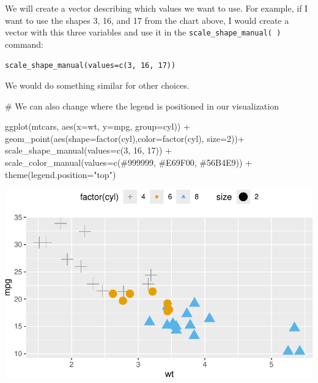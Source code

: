 \documentclass[
  letterpaper,
  DIV=11,
  numbers=noendperiod]{scrreprt}
\newenvironment{Shaded}{\begin{snugshade}}{\end{snugshade}}
\newcommand{\AttributeTok}[1]{\textcolor[rgb]{0.40,0.45,0.13}{#1}}
\newcommand{\CommentTok}[1]{\textcolor[rgb]{0.37,0.37,0.37}{#1}}
\newcommand{\DecValTok}[1]{\textcolor[rgb]{0.68,0.00,0.00}{#1}}
\newcommand{\FunctionTok}[1]{\textcolor[rgb]{0.28,0.35,0.67}{#1}}
\newcommand{\NormalTok}[1]{\textcolor[rgb]{0.00,0.23,0.31}{#1}}
\newcommand{\SpecialCharTok}[1]{\textcolor[rgb]{0.37,0.37,0.37}{#1}}
\newcommand{\StringTok}[1]{\textcolor[rgb]{0.13,0.47,0.30}{#1}}
\begin{document}
We will create a vector describing which values we want to use. For
example, if I want to use the shapes 3, 16, and 17 from the chart above,
I would create a vector with this three variables and use it in the
\texttt{scale\_shape\_manual(\ )} command:

\texttt{scale\_shape\_manual(values=c(3,\ 16,\ 17))}

We would do something similar for other choices.

\begin{Shaded}
\begin{Highlighting}[]
\CommentTok{\# We can also change where the legend is positioned in our visualization}

\FunctionTok{ggplot}\NormalTok{(mtcars, }\FunctionTok{aes}\NormalTok{(}\AttributeTok{x=}\NormalTok{wt, }\AttributeTok{y=}\NormalTok{mpg, }\AttributeTok{group=}\NormalTok{cyl)) }\SpecialCharTok{+}
  \FunctionTok{geom\_point}\NormalTok{(}\FunctionTok{aes}\NormalTok{(}\AttributeTok{shape=}\FunctionTok{factor}\NormalTok{(cyl),}\AttributeTok{color=}\FunctionTok{factor}\NormalTok{(cyl), }\AttributeTok{size=}\DecValTok{2}\NormalTok{))}\SpecialCharTok{+}
  \FunctionTok{scale\_shape\_manual}\NormalTok{(}\AttributeTok{values=}\FunctionTok{c}\NormalTok{(}\DecValTok{3}\NormalTok{, }\DecValTok{16}\NormalTok{, }\DecValTok{17}\NormalTok{)) }\SpecialCharTok{+}
  \FunctionTok{scale\_color\_manual}\NormalTok{(}\AttributeTok{values=}\FunctionTok{c}\NormalTok{(}\StringTok{\textquotesingle{}\#999999\textquotesingle{}}\NormalTok{, }\StringTok{\textquotesingle{}\#E69F00\textquotesingle{}}\NormalTok{, }\StringTok{\textquotesingle{}\#56B4E9\textquotesingle{}}\NormalTok{)) }\SpecialCharTok{+}
  \FunctionTok{theme}\NormalTok{(}\AttributeTok{legend.position=}\StringTok{"top"}\NormalTok{)}
\end{Highlighting}
\end{Shaded}

\includegraphics{Advanced_Scatterplot_Techniques_files/figure-pdf/unnamed-chunk-12-1.pdf}
\end{document}
